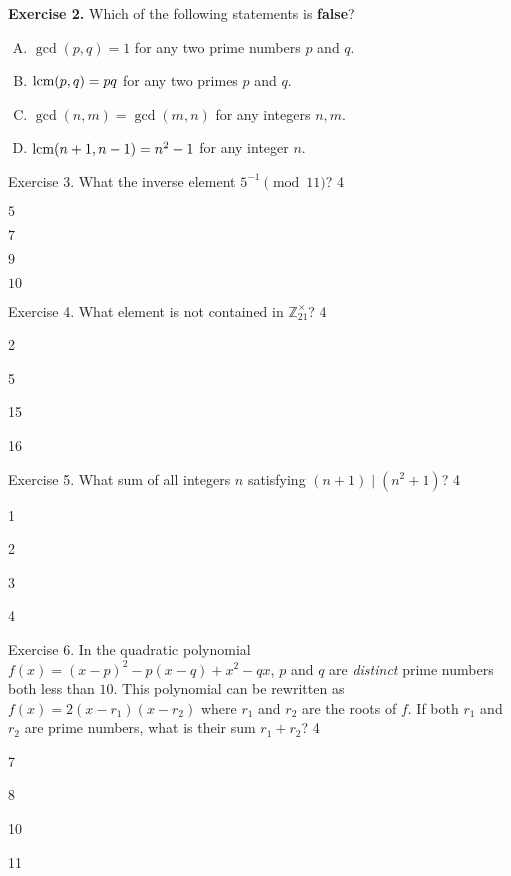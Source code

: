 \documentclass[../lecture-notes-148x210.tex]{subfiles}
\begin{document}
\textbf{Exercise 2.} Which of the following statements is \textbf{false}?

\begin{enumerate}[(A)]
    \item $\gcd(p,q)=1$ for any two prime numbers $p$ and $q$.
    \item $\text{lcm}(p,q)=pq$ for any two primes $p$ and $q$.
    \item $\gcd(n,m) = \gcd(m,n)$ for any integers $n,m$.
    \item $\text{lcm}(n+1,n-1) = n^2-1$ for any integer $n$.
\end{enumerate}

\begin{xexercise}
    {Exercise 3.}
    {What the inverse element $5^{-1} \pmod{11}$?}
    {4}
    {
        \item $5$
        \item $7$
        \item $9$
        \item $10$
    }
\end{xexercise}

\begin{xexercise}
    {Exercise 4.}
    {What element is not contained in $\mathbb{Z}_{21}^{\times}$?}
    {4}
    {
        \item 2 
        \item 5
        \item 15
        \item 16
    }
\end{xexercise}

\begin{xexercise}
    {Exercise 5.}
    {What sum of all integers $n$ satisfying $(n + 1) \mid (n^2 + 1)$?}
    {4}
    {
        \item 1
        \item 2
        \item 3
        \item 4
    }
\end{xexercise}

\begin{xexercise}
    {Exercise 6.} { In the quadratic polynomial $f(x) = (x-p)^2-p(x-q)+x^2-qx$,
    $p$ and $q$ are \emph{distinct} prime numbers both less than $10$. This
    polynomial can be rewritten as $f(x) = 2(x-r_1)(x-r_2)$ where $r_1$ and
    $r_2$ are the roots of $f$. If both $r_1$ and $r_2$ are prime numbers, what
    is their sum $r_1+r_2$? } {4} {
        \item 7
        \item 8
        \item 10
        \item 11
    }
\end{xexercise}
\end{document}
